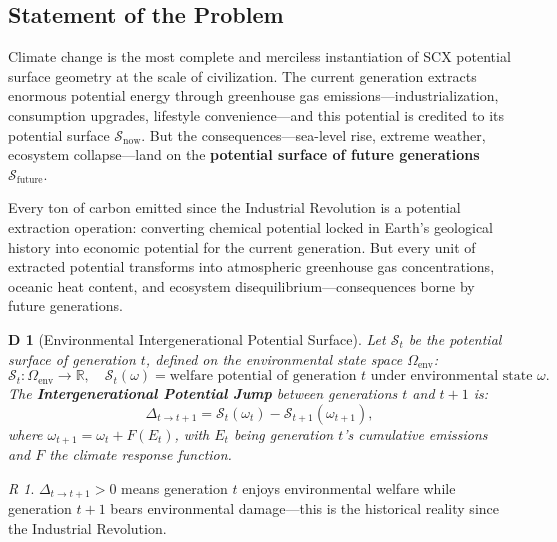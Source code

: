 \documentclass[12pt,a4paper]{article}
\newtheorem{definition}[theorem]Definition
\theoremstyle{remark}
\newtheorem{remark}[theorem]Remark
\newcommand{\R}{\mathbb{R}}
\newcommand{\GenS}{\mathcal{S}}
\begin{document}
\subsection{Statement of the Problem}
Climate change is the most complete and merciless instantiation of SCX potential surface geometry at the scale of civilization. The current generation extracts enormous potential energy through greenhouse gas emissions---industrialization, consumption upgrades, lifestyle convenience---and this potential is credited to its potential surface \(\GenS_{\text{now}}\). But the consequences---sea-level rise, extreme weather, ecosystem collapse---land on the \textbf{potential surface of future generations} \(\GenS_{\text{future}}\).

Every ton of carbon emitted since the Industrial Revolution is a potential extraction operation: converting chemical potential locked in Earth's geological history into economic potential for the current generation. But every unit of extracted potential transforms into atmospheric greenhouse gas concentrations, oceanic heat content, and ecosystem disequilibrium---consequences borne by future generations.

\begin{definition}[Environmental Intergenerational Potential Surface]\label{def:env_potential}
Let \(\GenS_t\) be the potential surface of generation \(t\), defined on the environmental state space \(\Omega_{\text{env}}\):
\begin{equation}
    \GenS_t: \Omega_{\text{env}} \to \R, \quad \GenS_t(\omega) = \text{welfare potential of generation }t\text{ under environmental state }\omega.
\end{equation}
The \textbf{Intergenerational Potential Jump} between generations \(t\) and \(t+1\) is:
\begin{equation}\label{eq:intergen_jump}
    \Delta_{t \to t+1} = \GenS_t(\omega_t) - \GenS_{t+1}(\omega_{t+1}),
\end{equation}
where \(\omega_{t+1} = \omega_t + F(E_t)\), with \(E_t\) being generation \(t\)'s cumulative emissions and \(F\) the climate response function.
\end{definition}

\begin{remark}
\(\Delta_{t \to t+1} > 0\) means generation \(t\) enjoys environmental welfare while generation \(t+1\) bears environmental damage---this is the historical reality since the Industrial Revolution.
\end{remark}
\end{document}
